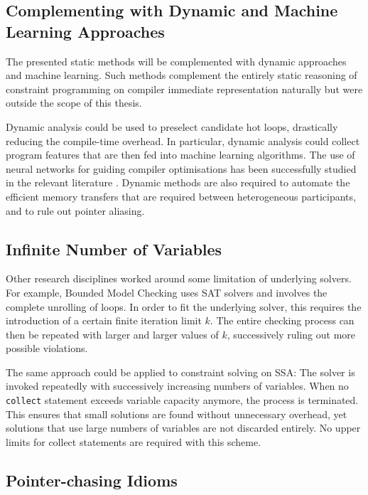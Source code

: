 \subsection*{Complementing with Dynamic and Machine Learning Approaches}

    The presented static methods will be complemented with dynamic approaches
    and machine learning.
    Such methods complement the entirely static reasoning of constraint
    programming on compiler immediate representation naturally but were
    outside the scope of this thesis.

    Dynamic analysis could be used to preselect candidate hot loops, drastically
    reducing the compile-time overhead.
    In particular, dynamic analysis could collect program features that are
    then fed into machine learning algorithms.
    The use of neural networks for guiding compiler optimisations has been
    successfully studied in the relevant literature
    \citep{DBLP:journals/pieee/WangO18}.
    Dynamic methods are also required to automate the efficient memory transfers
    that are required between heterogeneous participants, and to rule out
    pointer aliasing.

\subsection*{Infinite Number of Variables}

    Other research disciplines worked around some limitation of underlying
    solvers.
    For example, Bounded Model Checking \cite{Clarke:2001:BMC:510986.510987}
    uses SAT solvers and involves the complete unrolling of loops.
    In order to fit the underlying solver, this requires the introduction of a
    certain finite iteration limit $k$.
    The entire checking process can then be repeated with larger and larger
    values of $k$, successively ruling out more possible violations.

    The same approach could be applied to constraint solving on SSA:
    The solver is invoked repeatedly with successively increasing numbers of
    variables.
    When no \texttt{collect} statement exceeds variable capacity anymore, the
    process is terminated.
    This ensures that small solutions are found without unnecessary
    overhead, yet solutions that use large numbers of variables are not
    discarded entirely.
    No upper limits for collect statements are required with this scheme.

\subsection*{Pointer-chasing Idioms}

